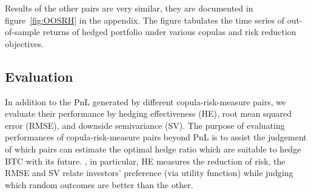 Results of the other pairs are very similar, they are documented in
figure~\ref{fig:OOSRH} in the appendix.
The figure tabulates the time series of out-of-sample returns of hedged portfolio under various copulas and risk reduction objectives.\medskip

\subsection{Evaluation}\label{subsec:evaluation}
In addition to the PnL generated by different copula-risk-measure pairs,
we evaluate their performance by hedging effectiveness (HE), root mean squared error (RMSE), and downside semivariance (SV).
The purpose of evaluating performances of copula-risk-measure pairs beyond PnL is to assist the judgement of which pairs can estimate the optimal hedge ratio which
are suitable to hedge BTC with its future.
, in particular, HE measures the reduction of risk, the RMSE and SV relate investors' preference
(via utility function) while judging which random outcomes are better than the other.


